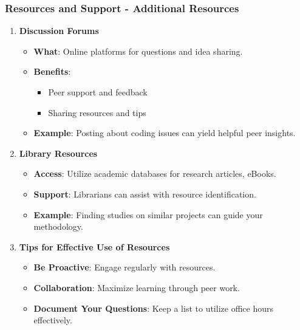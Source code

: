\documentclass[aspectratio=169]{beamer}
\begin{document}
\begin{frame}[fragile]
    \frametitle{Resources and Support - Additional Resources}
    \begin{enumerate}[resume]
        \item \textbf{Discussion Forums}
        \begin{itemize}
            \item \textbf{What}: Online platforms for questions and idea sharing.
            \item \textbf{Benefits}:
            \begin{itemize}
                \item Peer support and feedback
                \item Sharing resources and tips
            \end{itemize}
            \item \textbf{Example}: Posting about coding issues can yield helpful peer insights.
        \end{itemize}

        \item \textbf{Library Resources}
        \begin{itemize}
            \item \textbf{Access}: Utilize academic databases for research articles, eBooks.
            \item \textbf{Support}: Librarians can assist with resource identification.
            \item \textbf{Example}: Finding studies on similar projects can guide your methodology.
        \end{itemize}
        
        \item \textbf{Tips for Effective Use of Resources}
        \begin{itemize}
            \item \textbf{Be Proactive}: Engage regularly with resources.
            \item \textbf{Collaboration}: Maximize learning through peer work.
            \item \textbf{Document Your Questions}: Keep a list to utilize office hours effectively.
        \end{itemize}
    \end{enumerate}
\end{frame}
\end{document}
